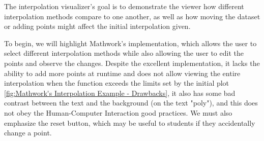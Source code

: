 The interpolation visualizer's goal is to demonstrate the viewer how different interpolation methods compare to one another, as well as how moving the dataset or adding points might affect the initial interpolation given.

To begin, we will highlight Mathwork's implementation, which allows the user to select different interpolation methods while also allowing the user to edit the points and observe the changes. Despite the excellent implementation, it lacks the ability to add more points at runtime and does not allow viewing the entire interpolation when the function exceeds the limits set by the initial plot \ref{fig:Mathwork's Interpolation Example - Drawbacks},  it also has some bad contrast between the text and the background (on the text "poly"), and this does not obey the Human-Computer Interaction good practices. We must also emphasize the reset button, which may be useful to students if they accidentally change a point. 

